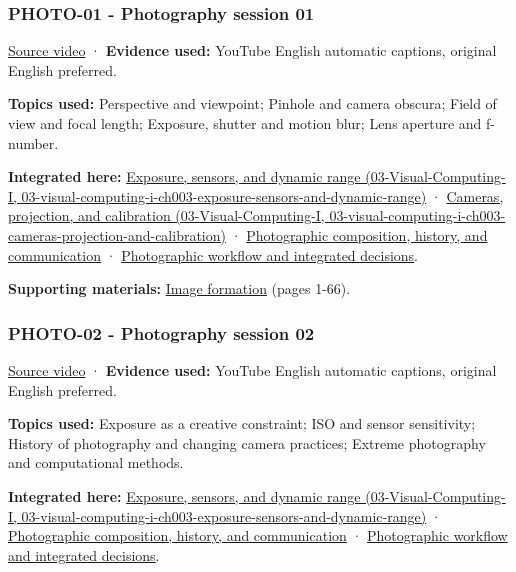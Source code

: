 \subsubsection{PHOTO-01 - Photography session 01}\label{04-visual-computing-ii-ch036-photo-01---photography-session-01}

\href{https://www.youtube.com/watch?v=y7HrM-fk_Rc}{Source video} · \textbf{Evidence used:} YouTube English automatic captions, original English preferred.

\textbf{Topics used:} Perspective and viewpoint; Pinhole and camera obscura; Field of view and focal length; Exposure, shutter and motion blur; Lens aperture and f-number.

\textbf{Integrated here:} \href{../03-Visual-Computing-I/main.pdf\#nameddest=03-visual-computing-i-ch003-exposure-sensors-and-dynamic-range}{Exposure, sensors, and dynamic range (03-Visual-Computing-I, 03-visual-computing-i-ch003-exposure-sensors-and-dynamic-range)} · \href{../03-Visual-Computing-I/main.pdf\#nameddest=03-visual-computing-i-ch003-cameras-projection-and-calibration}{Cameras, projection, and calibration (03-Visual-Computing-I, 03-visual-computing-i-ch003-cameras-projection-and-calibration)} · \hyperref[04-visual-computing-ii-ch034-photographic-composition-history-and-communication]{Photographic composition, history, and communication} · \hyperref[04-visual-computing-ii-ch034-photographic-workflow-and-integrated-decisions]{Photographic workflow and integrated decisions}.

\textbf{Supporting materials:} \href{https://drive.google.com/file/d/0B6w2XfPHEcZYdVd4anZzZTc3aE0/view?usp=sharing}{Image formation} (pages 1-66).

\subsubsection{PHOTO-02 - Photography session 02}\label{04-visual-computing-ii-ch036-photo-02---photography-session-02}

\href{https://www.youtube.com/watch?v=d_sJFslHQsg}{Source video} · \textbf{Evidence used:} YouTube English automatic captions, original English preferred.

\textbf{Topics used:} Exposure as a creative constraint; ISO and sensor sensitivity; History of photography and changing camera practices; Extreme photography and computational methods.

\textbf{Integrated here:} \href{../03-Visual-Computing-I/main.pdf\#nameddest=03-visual-computing-i-ch003-exposure-sensors-and-dynamic-range}{Exposure, sensors, and dynamic range (03-Visual-Computing-I, 03-visual-computing-i-ch003-exposure-sensors-and-dynamic-range)} · \hyperref[04-visual-computing-ii-ch034-photographic-composition-history-and-communication]{Photographic composition, history, and communication} · \hyperref[04-visual-computing-ii-ch034-photographic-workflow-and-integrated-decisions]{Photographic workflow and integrated decisions}.


